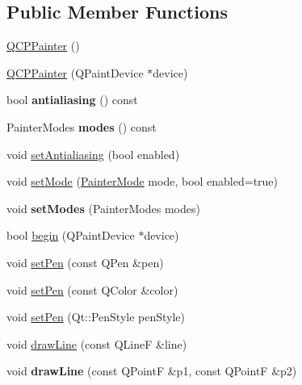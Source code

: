 \subsection*{Public Member Functions}
\begin{DoxyCompactItemize}
\item 
\hyperlink{class_q_c_p_painter_a3c52cb0f43f34573d29bea487da28fe8}{Q\+C\+P\+Painter} ()
\item 
\hyperlink{class_q_c_p_painter_ae58dbb1795ddc4351ab324dc9898aa22}{Q\+C\+P\+Painter} (Q\+Paint\+Device $\ast$device)
\item 
\mbox{\label{class_q_c_p_painter_a5aff96296e995f6f35b2596a482aae37}} 
bool {\bfseries antialiasing} () const
\item 
\mbox{\label{class_q_c_p_painter_aef102658219b24165f7ee2aad1b9e48f}} 
Painter\+Modes {\bfseries modes} () const
\item 
void \hyperlink{class_q_c_p_painter_aaba1deb9188244d9ea65b035112b4d05}{set\+Antialiasing} (bool enabled)
\item 
void \hyperlink{class_q_c_p_painter_af6b1f7d2bbc548b10aa55d8b6ad49577}{set\+Mode} (\hyperlink{class_q_c_p_painter_a156cf16444ff5e0d81a73c615fdb156d}{Painter\+Mode} mode, bool enabled=true)
\item 
\mbox{\label{class_q_c_p_painter_a5fac93adc29c7c4dea9f3e171e9e635e}} 
void {\bfseries set\+Modes} (Painter\+Modes modes)
\item 
bool \hyperlink{class_q_c_p_painter_a0a41146ccd619dceab6e25ec7b46b044}{begin} (Q\+Paint\+Device $\ast$device)
\item 
void \hyperlink{class_q_c_p_painter_af9c7a4cd1791403901f8c5b82a150195}{set\+Pen} (const Q\+Pen \&pen)
\item 
void \hyperlink{class_q_c_p_painter_a5c4d88f21564e156e88ef807f7cf0003}{set\+Pen} (const Q\+Color \&color)
\item 
void \hyperlink{class_q_c_p_painter_a25e76095aae41da0d08035060e5f81ca}{set\+Pen} (Qt\+::\+Pen\+Style pen\+Style)
\item 
void \hyperlink{class_q_c_p_painter_a0b4b1b9bd495e182c731774dc800e6e0}{draw\+Line} (const Q\+LineF \&line)
\item 
\mbox{\label{class_q_c_p_painter_ad1638db27929491b3f1beb74d6cbad5e}} 
void {\bfseries draw\+Line} (const Q\+PointF \&p1, const Q\+PointF \&p2)

\end{DoxyCompactItemize}
